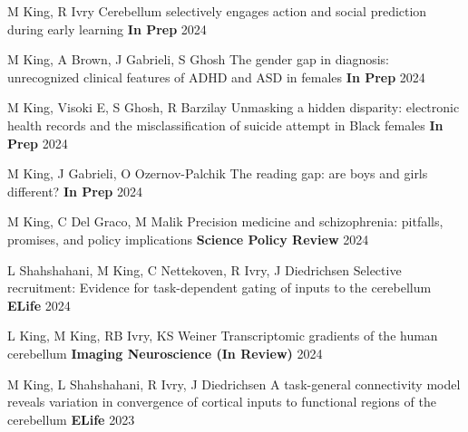 


\begin{cventries}

  \cventry
    {M King, R Ivry} %
    {Cerebellum selectively engages action and social prediction during early learning} %
    {\textbf{In Prep}} %
    {2024} %
    {}

  \cventry
    {M King, A Brown, J Gabrieli, S Ghosh} %
    {The gender gap in diagnosis: unrecognized clinical features of ADHD and ASD in females} %
    {\textbf{In Prep}} %
    {2024} %
    {}
    
   \cventry
	 {M King, Visoki E, S Ghosh, R Barzilay} %
	 {Unmasking a hidden disparity: electronic health records and the misclassification of suicide attempt in Black females} %
 	 {\textbf{In Prep}} %
 	 {2024} %
 	 {}
 
    
  \cventry
    {M King, J Gabrieli, O Ozernov-Palchik} %
    {The reading gap: are boys and girls different?} %
    {\textbf{In Prep}} %
    {2024} %
    {}
    
 \cventry
   {M King, C Del Graco, M Malik} %
   {Precision medicine and schizophrenia: pitfalls, promises, and policy implications} %
   {\textbf{Science Policy Review}} %
   {2024} %
   {}
   
 \cventry
    {L Shahshahani, M King, C Nettekoven, R Ivry, J Diedrichsen} %
    {Selective recruitment: Evidence for task-dependent gating of inputs to the cerebellum} %
    {\textbf{ELife}} %
    {2024} %
    {}

  \cventry
    {L King, M King, RB Ivry, KS Weiner} %
    {Transcriptomic gradients of the human cerebellum} %
    {\textbf{Imaging Neuroscience (In Review)}} %
    {2024} %
    {}
    
  \cventry
    {M King, L Shahshahani, R Ivry, J Diedrichsen} %
    {A task-general connectivity model reveals variation in convergence of cortical inputs to functional regions of the cerebellum} %
    {\textbf{ELife}} %
    {2023} %
    {}


\end{cventries}
